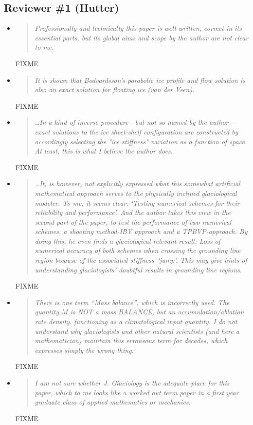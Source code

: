 \documentclass[11pt,reqno]{amsart}
\newcommand{\reply}[2]{
\medskip\medskip
\item  \begin{quote}
\emph{#1}
\end{quote}

\smallskip
\noindent #2}
\begin{document}
\subsection*{Reviewer \#1 (Hutter)}  \begin{itemize}
\reply{Professionally and technically this paper is well written, correct in its essential parts, but its global aims and scope by the author are not clear to me.}
{FIXME}

\reply{It is shown that Bodvardsson's parabolic ice profile and flow solution is also an exact solution for floating ice (van der Veen).}
{FIXME}

\reply{\dots In a kind of inverse procedure---but not so named by the author---exact solutions to the ice sheet-shelf configuration are constructed by accordingly selecting the "ice stiffness" variation as a function of space. At least, this is what I believe the author does.}
{FIXME}

\reply{\dots It, is however, not explicitly expressed what this somewhat artificial mathematical approach serves to the physically inclined glaciological modeler. To me, it seems clear: `Testing numerical schemes for their reliability and performance'. And the author takes this view in the second part of the paper, to test the performance of two numerical schemes, a shooting method-IBV approach and a TPBVP-approach. By doing this, he even finds a glaciological relevant result: Loss of numerical accuracy of both schemes when crossing the grounding line region because of the associated stiffness--`jump'.  This may give hints of understanding glaciologists' doubtful results in grounding line regions.}
{FIXME}

\reply{There is one term ``Mass balance'', which is incorrectly used. The quantity $M$ is NOT a mass BALANCE, but an accumulation/ablation rate density, functioning as a climatological input quantity. I do not understand why glaciologists and other natural scientists (and here a mathematician) maintain this erroneous term for decades, which expresses simply the wrong thing.}
{FIXME}

\reply{I am not sure whether J. Glaciology is the adequate place for this paper, which to me looks like a worked out term paper in a first year graduate class of applied mathematics or mechanics.}
{FIXME}

\end{itemize}
\end{document}
